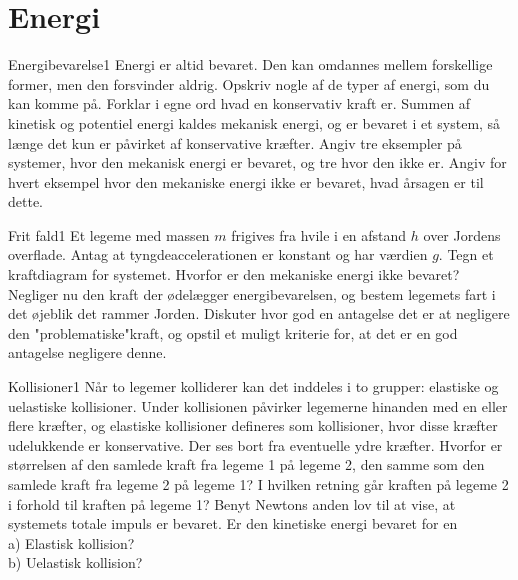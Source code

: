 \section*{Energi}
%
%
\begin{opgave}{Energibevarelse}{1} \label{opg:Energibevarelse}
Energi er altid bevaret. Den kan omdannes mellem forskellige former, men den forsvinder aldrig.
\opg Opskriv nogle af de typer af energi, som du kan komme på.
\opg Forklar i egne ord hvad en konservativ kraft er.
\opg Summen af kinetisk og potentiel energi kaldes mekanisk energi, og er bevaret i et system, så længe det kun er påvirket af konservative kræfter. Angiv tre eksempler på systemer, hvor den mekanisk energi er bevaret, og tre hvor den ikke er.
\opg Angiv for hvert eksempel hvor den mekaniske energi ikke er bevaret, hvad årsagen er til dette.
\end{opgave}
\begin{opgave}{Frit fald}{1} \label{opg:FritFald}
Et legeme med massen $m$ frigives fra hvile i en afstand $h$ over Jordens overflade. Antag at tyngdeaccelerationen er konstant og har værdien $g$.
\opg Tegn et kraftdiagram for systemet.
\opg Hvorfor er den mekaniske energi ikke bevaret?
\opg Negliger nu den kraft der ødelægger energibevarelsen, og bestem legemets fart i det øjeblik det rammer Jorden.
\opg Diskuter hvor god en antagelse det er at negligere den "problematiske"\;kraft, og opstil et muligt kriterie for, at det er en god antagelse negligere denne.
\end{opgave}
%
%
\begin{opgave}{Kollisioner}{1}
Når to legemer kolliderer kan det inddeles i to grupper: elastiske og uelastiske kollisioner. Under kollisionen påvirker legemerne hinanden med en eller flere kræfter, og elastiske kollisioner defineres som kollisioner, hvor disse kræfter udelukkende er konservative. Der ses bort fra eventuelle ydre kræfter.
\opg Hvorfor er størrelsen af den samlede kraft fra legeme 1 på legeme 2, den samme som den samlede kraft fra legeme 2 på legeme 1?
\opg I hvilken retning går kraften på legeme 2 i forhold til kraften på legeme 1?
\opg Benyt Newtons anden lov til at vise, at systemets totale impuls er bevaret.
\opg Er den kinetiske energi bevaret for en \\
a) Elastisk kollision? \\
b) Uelastisk kollision?\\
\end{opgave}
%
%
